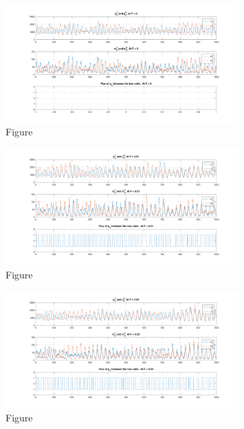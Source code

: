 \documentclass[12pt]{article}
\renewcommand{\(}{\left (}
\renewcommand{\)}{\right )}
\begin{document}
\begin{figure}[ht]
    \centering
	\begin{minipage}{0.99\textwidth}
		\centering
		\includegraphics[width=0.8\textwidth]{sto_two_cell_same_period_diff_states_F0.png}
		\caption*{\small Figure}
	\end{minipage}
\end{figure}
\begin{figure}[ht]
    \centering
	\begin{minipage}{0.99\textwidth}
		\centering
		\includegraphics[width=0.8\textwidth]{sto_two_cell_same_period_diff_states_F01.png}
		\caption*{\small Figure}
	\end{minipage}
\end{figure}
\begin{figure}[ht]
    \centering
	\begin{minipage}{0.99\textwidth}
		\centering
		\includegraphics[width=0.8\textwidth]{sto_two_cell_same_period_diff_states_F02.png}
		\caption*{\small Figure}
	\end{minipage}
\end{figure}
\end{document}
